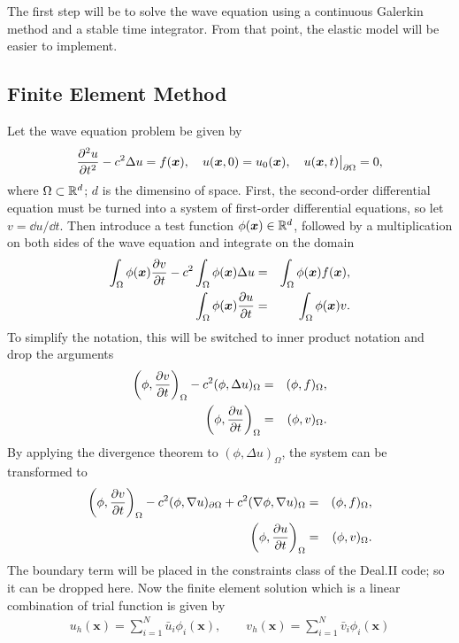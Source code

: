 The first step will be to solve the wave equation using a continuous Galerkin method and a stable time integrator. From that point, the elastic model will be easier to implement.

\subsection{Finite Element Method}
Let the wave equation problem be given by
\begin{equation}
  \frac{\partial^2u}{\partial t^2} - c^2\Delta u = f(\bm{x}), \quad u(\bm{x},0) = u_0(\bm{x}), \quad u(\bm{x},t)\big|_{\partial\Omega} = 0,
\end{equation}
where $\Omega\subset\mathbb{R}^d$; $d$ is the dimensino of space. First, the second-order differential equation must be turned into a system of first-order differential equations, so let $v=\dd u/\dd t$. Then introduce a test function $\phi(\bm{x})\in\mathbb{R}^d$, followed by a multiplication on both sides of the wave equation and integrate on the domain
\begin{eqnarray*}
  \int_\Omega \phi(\bm{x})\frac{\partial v}{\partial t} - c^2\int_\Omega\phi(\bm{x})\Delta u & = & \int_\Omega \phi(\bm{x})f(\bm{x}), \\
  \int_\Omega \phi(\bm{x})\frac{\partial u}{\partial t} & = & \int_\Omega \phi(\bm{x}) v.
\end{eqnarray*}
To simplify the notation, this will be switched to inner product notation and drop the arguments
\begin{eqnarray*}
  \bigg(\phi,\frac{\partial v}{\partial t}\bigg)_\Omega - c^2(\phi,\Delta u)_\Omega & = & (\phi,f)_\Omega, \\
  \bigg(\phi,\frac{\partial u}{\partial t}\bigg)_\Omega & = & (\phi,v)_\Omega.
\end{eqnarray*}
By applying the divergence theorem to $(\phi,\Delta u)_\Omega$, the system can be transformed to
\begin{eqnarray*}
  \bigg(\phi,\frac{\partial v}{\partial t}\bigg)_\Omega - c^2(\phi,\nabla u)_{\partial\Omega} + c^2(\nabla\phi,\nabla u)_\Omega & = & (\phi,f)_\Omega, \\
  \bigg(\phi,\frac{\partial u}{\partial t}\bigg)_\Omega & = & (\phi,v)_\Omega.
\end{eqnarray*}
The boundary term will be placed in the constraints class of the Deal.II code; so it can be dropped here. Now the finite element solution which is a linear combination of trial function is given by
\begin{eqnarray*}
  u_h(\bm{x}) = \sum^N_{i=1} \bar{u}_i\phi_i(\bm{x}), \quad\quad v_h(\bm{x}) = \sum^N_{i=1} \bar{v}_i\phi_i(\bm{x})
\end{eqnarray*}
